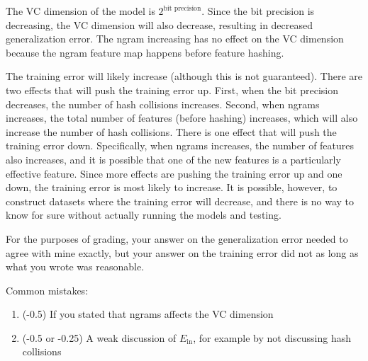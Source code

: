 \documentclass[10pt]{exam}
\theoremstyle{definition}
\newcommand{\Ein}{E_{\text{in}}}
\begin{document}
\begin{solution}
    The VC dimension of the model is $2^{\text{bit precision}}$.
    Since the bit precision is decreasing,
    the VC dimension will also decrease,
    resulting in decreased generalization error.
    The ngram increasing has no effect on the VC dimension because the ngram feature map happens before feature hashing.

    The training error will likely increase (although this is not guaranteed).
    There are two effects that will push the training error up.
    First, when the bit precision decreases, the number of hash collisions increases.
    Second, when ngrams increases, the total number of features (before hashing) increases, which will also increase the number of hash  collisions.
    There is one effect that will push the training error down.
    Specifically, when ngrams increases, the number of features also increases, and it is possible that one of the new features is a particularly effective feature.
    Since more effects are pushing the training error up and one down,
    the training error is most likely to increase.
    It is possible, however, to construct datasets where the training error will decrease, and there is no way to know for sure without actually running the models and testing.

    For the purposes of grading, your answer on the generalization error needed to agree with mine exactly, but your answer on the training error did not as long as what you wrote was reasonable.
%

Common mistakes:
\begin{enumerate}
    \item (-0.5) If you stated that ngrams affects the VC dimension
    \item (-0.5 or -0.25) A weak discussion of $\Ein$, for example by not discussing hash collisions
\end{enumerate}
\end{solution}
\end{document}
